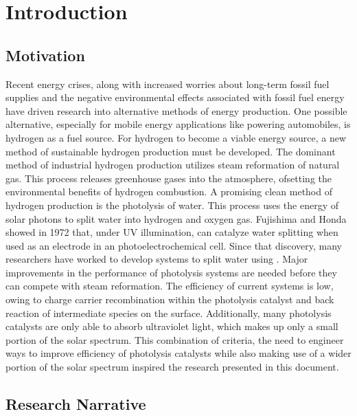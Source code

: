 
\chapter{Introduction}
\label{ch:introduction}


\section{Motivation}
\label{sec:intro.motivation}


Recent energy crises, along with increased worries about long-term fossil fuel supplies and the negative environmental effects associated with fossil fuel energy have driven research into alternative methods of energy production. One possible alternative, especially for mobile energy applications like powering automobiles, is hydrogen as a fuel source. For hydrogen to become a viable energy source, a new method of sustainable hydrogen production must be developed. The dominant method of industrial hydrogen production utilizes steam reformation of natural gas.\cite{Report:2004wb} This process releases greenhouse gases into the atmosphere, ofsetting the environmental benefits of hydrogen combustion.
A promising clean method of hydrogen production is the photolysis of water. This process uses the energy of solar photons to split water into hydrogen and oxygen gas. Fujishima and Honda\cite{Fujishima:1972hc} showed in 1972 that, under UV illumination,  can catalyze water splitting when used as an electrode in an photoelectrochemical cell. Since that discovery, many researchers have worked to develop systems to split water using .\cite{User:2001tg,Frank:1987hd,Karakitsou:1993fq,Linsebigler:1995gi,Schrauzer:1977ex} Major improvements in the performance of photolysis systems are needed before they can compete with steam reformation. The efficiency of current systems is low, owing to charge carrier recombination within the photolysis catalyst and back reaction of intermediate species on the surface. Additionally, many photolysis catalysts are only able to absorb ultraviolet light, which makes up only a small portion of the solar spectrum. This combination of criteria, the need to engineer ways to improve efficiency of photolysis catalysts while also making use of a wider portion of the solar spectrum inspired the research presented in this document.


\section{Research Narrative}
\label{sec:intro.objectives}


